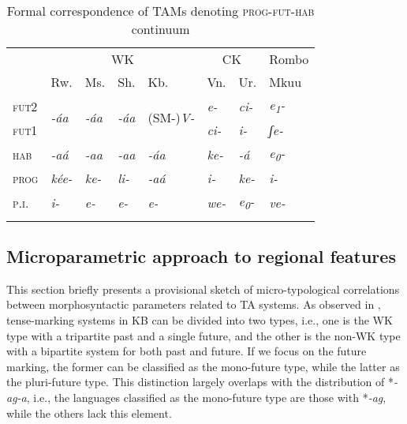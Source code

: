 \documentclass[output=paper]{langscibook}
\begin{document}
\begin{table}
\small
\begin{tabularx}{\textwidth}{XXXXXXXX} 
\lsptoprule
& \multicolumn{4}{c}{WK} & \multicolumn{2}{c}{CK} & Rombo\\
\cmidrule(lr){2-5}\cmidrule(lr){6-7}\cmidrule(lr){8-8}
& Rw. & Ms. & Sh. & Kb. & Vn. & Ur. & Mkuu\\
\midrule
{\scshape fut2} & \multirow{2}{=}{\itshape {}-áa} & \multirow{2}{=}{\itshape {}-áa} & \multirow{2}{=}{\itshape {}-áa} & \multirow{2}{=}{(SM-)\textit{V-}} & {\itshape e-} & {\itshape ci-} & \textit{e\textsubscript{1}}\textit{{}-}\\
{\scshape fut1} &  &  &  &  & {\itshape ci-} & {\itshape i-} & {\itshape ʃe-}\\
{\scshape hab} & {\itshape {}-aá} & {\itshape {}-aa} & {\itshape {}-aa} & \textit{{}-áa} & {\itshape ke-} & {\itshape {}-á} & \textit{e\textsubscript{0}}\textit{{}-}\\
{ \textsc{prog}} & {\itshape kée-} & {\itshape ke-} & {\itshape li-} & {\itshape {}-aá} & {\itshape i-} & {\itshape ke-} & {\itshape i-}\\
{\scshape p.i.} & {\itshape i-} & {\itshape e-} & {\itshape e-} & {\itshape e-} & {\itshape we-} & \textit{e\textsubscript{0}}\textit{{}-} & {\itshape ve-}\\
\lspbottomrule
\end{tabularx}
\caption{Formal correspondence of TAMs denoting \textsc{prog}-\textsc{fut}-\textsc{hab} continuum}
\label{tab:shinagawa:11}
\end{table}

\subsection{Microparametric approach to regional features}\label{sec:shinagawa:4.2}

 This section briefly presents a provisional sketch of micro-typological correlations between morphosyntactic parameters related to TA systems. As observed in , tense-marking systems in KB can be divided into two types, i.e., one is the WK type with a tripartite past and a single future, and the other is the non-WK type with a bipartite system for both past and future. If we focus on the future marking, the former can be classified as the mono-future type, while the latter as the pluri-future type. This distinction largely overlaps with the distribution of *\textit{{}-ag-a}, i.e., the languages classified as the mono-future type are those with *\textit{{}-ag}, while the others lack this element.
\end{document}
